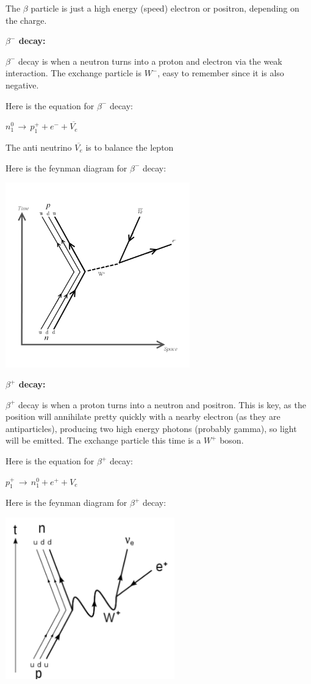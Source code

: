 \documentclass[a4paper, 12pt]{article}
\begin{document}
The $\beta$ particle is just a high energy (speed) electron or positron, depending on the charge.

\textbf{$\beta^-$ decay:}

$\beta^-$ decay is when a neutron turns into a proton and electron via the weak interaction. The exchange particle is $W^-$, easy to remember since it is also negative.

Here is the equation for $\beta^-$ decay:

$n^0_1 \, \rightarrow \, p^+_1 + e^- + \overline{V_e}$

The anti neutrino $\overline{V_e}$ is to balance the lepton 

Here is the feynman diagram for $\beta^-$ decay:

\begin{center}
\includegraphics[height=8cm]{images/betaMinus.png}
\end{center}

\textbf{$\beta^+$ decay:}

$\beta^+$ decay is when a proton turns into a neutron and positron. This is key, as the position will annihilate pretty quickly with a nearby electron (as they are antiparticles), producing two high energy photons (probably gamma), so light will be emitted. The exchange particle this time is a $W^+$ boson.

Here is the equation for $\beta^+$ decay:

$p^+_1 \, \rightarrow \, n^0_1 + e^+ + V_e$

Here is the feynman diagram for $\beta^+$ decay:

\begin{center}
\includegraphics[height=7cm]{images/betaPlus.png}
\end{center}
\end{document}

